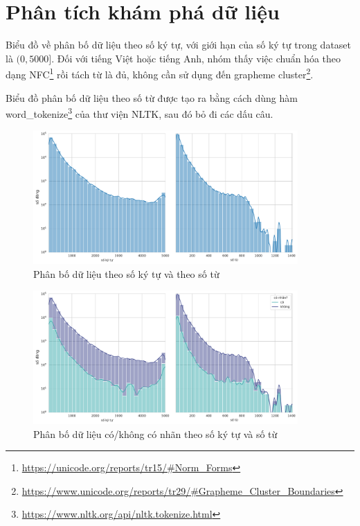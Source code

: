 \section*{Phân tích khám phá dữ liệu}
Biểu đồ về phân bố dữ liệu theo số ký tự, với giới hạn của số ký tự trong dataset là $(0,5000]$. Đối với tiếng Việt hoặc tiếng Anh, nhóm thấy việc chuẩn hóa theo dạng NFC\footnote{\url{https://unicode.org/reports/tr15/\#Norm\_Forms}} rồi tách từ là đủ, không cần sử dụng đến grapheme cluster\footnote{\url{https://www.unicode.org/reports/tr29/\#Grapheme\_Cluster\_Boundaries}}.

Biểu đồ phân bố dữ liệu theo số từ được tạo ra bằng cách dùng hàm word\_tokenize\footnote{\url{https://www.nltk.org/api/nltk.tokenize.html}} của thư viện NLTK, sau đó bỏ đi các dấu câu.
\begin{figure}[htb]
    \centering
    \includegraphics[width=0.9\textwidth]{chapter_2/image/dist_num_chars_and_words.pdf}
    \caption{Phân bố dữ liệu theo số ký tự và theo số từ}
    \label{figure:dist_num_chars_and_words}
\end{figure}
\begin{figure}[htb]
    \centering
    \includegraphics[width=0.9\textwidth]{chapter_2/image/dist_num_chars_and_words_by_has_label.pdf}
    \caption{Phân bố dữ liệu có/không có nhãn theo số ký tự và số từ}
\end{figure}



